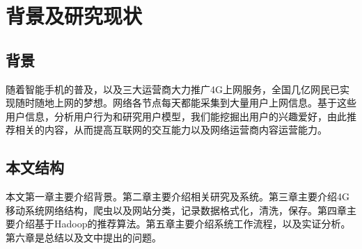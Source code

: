 \chapter{背景及研究现状}

\section{背景}
随着智能手机的普及，以及三大运营商大力推广4G上网服务，全国几亿网民已实现随时随地上网的梦想。网络各节点每天都能采集到大量用户上网信息。基于这些用户信息，分析用户行为和研究用户模型，我们能挖掘出用户的兴趣爱好，由此推荐相关的内容，从而提高互联网的交互能力以及网络运营商内容运营能力。

\section{本文结构}
本文第一章主要介绍背景。第二章主要介绍相关研究及系统。第三章主要介绍4G移动系统网络结构，爬虫以及网站分类，记录数据格式化，清洗，保存。第四章主要介绍基于Hadoop的推荐算法。第五章主要介绍系统工作流程，以及实证分析。第六章是总结以及文中提出的问题。
